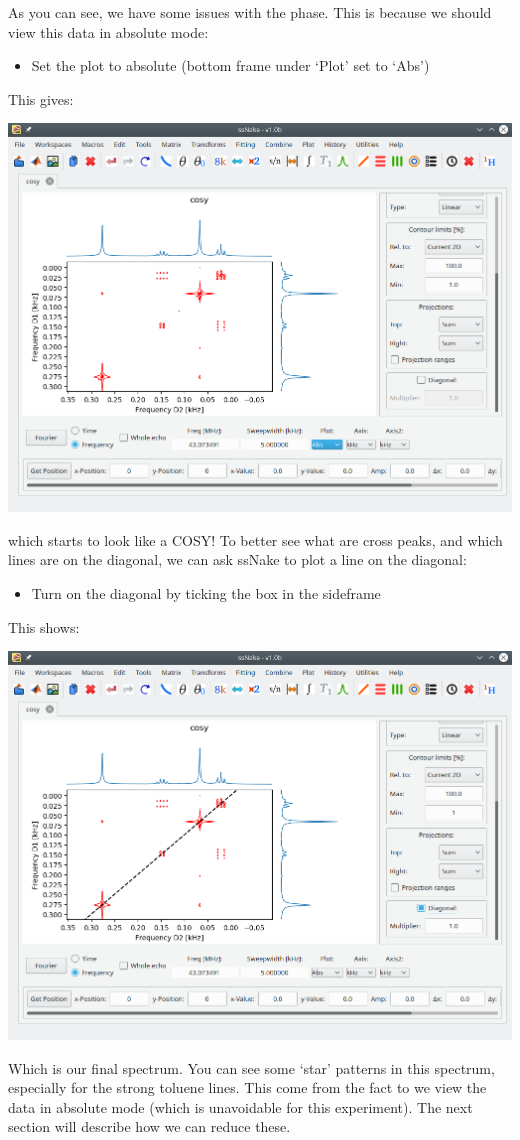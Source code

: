 \documentclass[11pt,a4paper]{article}
\begin{document}
As you can see, we have some issues with the phase. This is because we should view this data in
absolute mode:
\begin{itemize}
  \item Set the plot to absolute (bottom frame under `Plot' set to `Abs')
\end{itemize}
This gives:
\begin{center}
\includegraphics[width=0.8\linewidth]{Figs/Fig4.png}
\end{center}
which starts to look like a COSY! To better see what are cross peaks, and which lines are on the
diagonal, we can ask ssNake to plot a line on the diagonal:
\begin{itemize}
  \item Turn on the diagonal by ticking the box in the sideframe
\end{itemize}
This shows:
\begin{center}
\includegraphics[width=0.8\linewidth]{Figs/Fig5.png}
\end{center}
Which is our final spectrum. You can see some `star' patterns in this spectrum, especially for the
strong toluene lines. This come from the fact to we view the data in absolute mode (which is
unavoidable for this experiment). The next section will describe how we can reduce these. 
\end{document}
